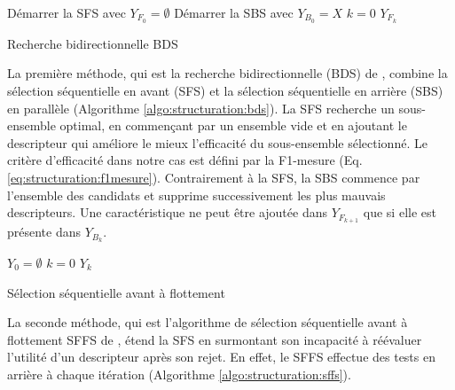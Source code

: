 \begin{algorithm}[H] \small
	Démarrer la SFS avec $Y_{F_0}= \emptyset $\; 
	Démarrer la SBS avec $Y_{B_0}=X$\; $k=0$\;
	\Return $Y_{F_k}$\;
	\caption{Recherche bidirectionnelle BDS} \label{algo:structuration:bds}
\end{algorithm}
La première méthode, qui est la recherche bidirectionnelle (BDS) de \citet{liu2012featureSelection}, combine la sélection séquentielle en avant (SFS) et la sélection séquentielle en arrière (SBS) en parallèle (Algorithme \ref{algo:structuration:bds}). 
La SFS recherche un sous-ensemble optimal, en commençant par un ensemble vide et en ajoutant le descripteur qui améliore le mieux l'efficacité du sous-ensemble sélectionné. Le critère d'efficacité dans notre cas est défini par la F1-mesure (Eq. \ref{eq:structuration:f1mesure}). Contrairement à la SFS, la SBS commence par l'ensemble des candidats et supprime successivement les plus mauvais descripteurs. Une caractéristique ne peut être ajoutée dans $Y_{F_{k+1}}$ que si elle est présente dans $Y_{B_{k}}$.



\begin{algorithm}[H] %
	$Y_0= \emptyset $\; 
	$k=0$\;
	\Return $Y_k$\;
	\caption{Sélection séquentielle avant à flottement}\label{algo:structuration:sffs}
\end{algorithm}

La seconde méthode, qui est l'algorithme de sélection séquentielle avant à flottement SFFS  de \citet{pudil1994floatingFeatSelection}, étend la SFS en surmontant son incapacité à réévaluer l'utilité d'un descripteur après son rejet. En effet, le SFFS effectue des tests en arrière à chaque itération (Algorithme \ref{algo:structuration:sffs}).

